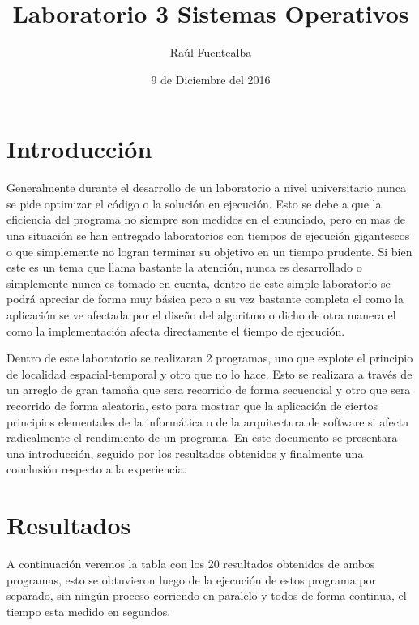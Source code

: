 \documentclass{article}
\title{Laboratorio 3 Sistemas Operativos}
\author{Raúl Fuentealba}
\date{9 de Diciembre del 2016}
\begin{document}
\maketitle

\section{Introducción}

	Generalmente durante el desarrollo de un laboratorio a nivel universitario nunca se pide optimizar el código o la solución en ejecución. Esto se debe a que la eficiencia del programa no siempre son medidos en el enunciado, pero en mas de una situación se han entregado laboratorios con tiempos de ejecución gigantescos o que simplemente no logran terminar su objetivo en un tiempo prudente. Si bien este es un tema que llama bastante la atención, nunca es desarrollado o simplemente nunca es tomado en cuenta, dentro de este simple laboratorio se podrá apreciar de forma muy básica pero a su vez bastante completa el como la aplicación se ve afectada por el diseño del algoritmo o dicho de otra manera el como la implementación afecta directamente el tiempo de ejecución.

	Dentro de este laboratorio se realizaran 2 programas, uno que explote el principio de localidad espacial-temporal y otro que no lo hace. Esto se realizara a través de un arreglo de gran tamaña que sera recorrido de forma secuencial y otro que sera recorrido de forma aleatoria, esto para mostrar que la aplicación de ciertos principios elementales de la informática o de la arquitectura de software si afecta radicalmente el rendimiento de un programa. En este documento se presentara una introducción, seguido por los resultados obtenidos y finalmente una conclusión respecto a la experiencia.
	
	\newpage
	

\section{Resultados}

    A continuación veremos la tabla con los 20 resultados obtenidos de ambos programas, esto se obtuvieron luego de la ejecución de estos programa por separado, sin ningún proceso corriendo en paralelo y todos de forma continua, el tiempo esta medido en segundos.
    
\end{document}
